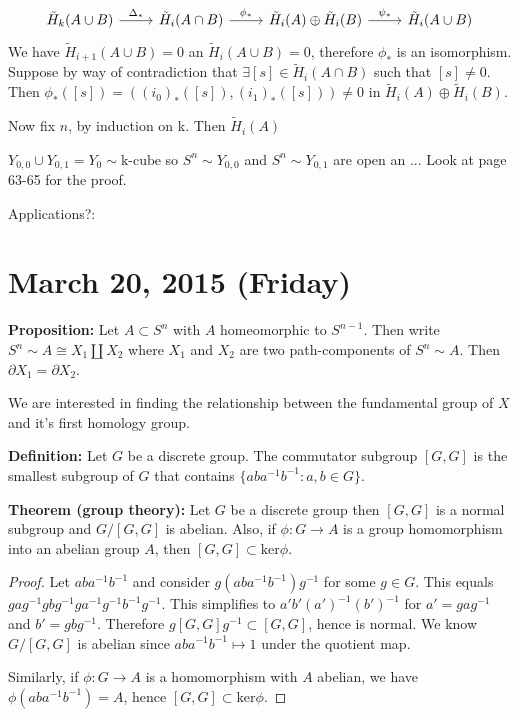 \documentclass{article}
\begin{document}
\[
\begin{tikzcd}
\tilde{H}_k(A \cup B) \arrow[r, "\Delta_*"] & \tilde{H}_i(A \cap B) \arrow[r, "\phi_*"] & \tilde{H}_i(A) \oplus \tilde{H}_i(B) \arrow[r, "\psi_*"] & \tilde{H}_i(A \cup B)
\end{tikzcd}
\]
We have $\tilde{H}_{i+1}(A \cup B) = 0$ an $\tilde{H}_i(A \cup B) = 0$,
therefore $\phi_*$ is an isomorphism. Suppose by way of contradiction that $\exists [s] \in \tilde{H}_i(A \cap B)$ such that $[s] \neq 0$. Then $\phi_*([s]) = ((i_0)_*([s]), (i_1)_*([s])) \neq 0$ in $\tilde{H}_i(A)\oplus \tilde{H}_i(B)$.

Now fix $n$, by induction on k. Then $\tilde{H}_i(A)$

$Y_{0,0} \cup Y_{0,1} = Y_0 \sim \text{k-cube}$ so $S^n \sim Y_{0,0}$ and $S^n \sim Y_{0,1}$ are open an ... Look at page 63-65 for the proof. 

Applications?:

\section{March 20, 2015 (Friday)}
\textbf{Proposition:} Let $A \subset S^n$ with $A$ homeomorphic to $S^{n-1}$. Then write $S^n \sim A \cong X_1 \coprod X_2$ where $X_1$ and $X_2$ are two path-components of $S^n \sim A$. Then $\partial X_1 = \partial X_2$.

We are interested in finding the relationship between the fundamental group of $X$ and it's first homology group.

\textbf{Definition:} Let $G$ be a discrete group. The commutator subgroup $[G,G]$ is the smallest subgroup of $G$ that contains $\{ aba^{-1}b^{-1} : a,b \in G \}$.

\textbf{Theorem (group theory):} Let $G$ be a discrete group then $[G,G]$ is a normal subgroup and $G/[G,G]$ is abelian. Also, if $\phi: G \to A$ is a group homomorphism into an abelian group $A$, then $[G,G] \subset \text{ker}\phi$.
\begin{proof}
Let $aba^{-1}b^{-1}$ and consider $g(aba^{-1}b^{-1})g^{-1}$ for some $g \in G$. This equals $gag^{-1}gbg^{-1}ga^{-1}g^{-1}b^{-1}g^{-1}$. This simplifies to $a'b'(a')^{-1}(b')^{-1}$ for $a' = gag^{-1}$ and $b' = gbg^{-1}$. Therefore $g[G,G]g^{-1} \subset [G,G]$, hence is normal. We know $G/[G,G]$ is abelian since $aba^{-1}b^{-1} \mapsto 1$ under the quotient map.

Similarly, if $\phi:G \to A$ is a homomorphism with $A$ abelian, we have $\phi(aba^{-1}b^{-1}) = A$, hence $[G,G] \subset \text{ker}\phi$.
\end{proof}
\end{document}
